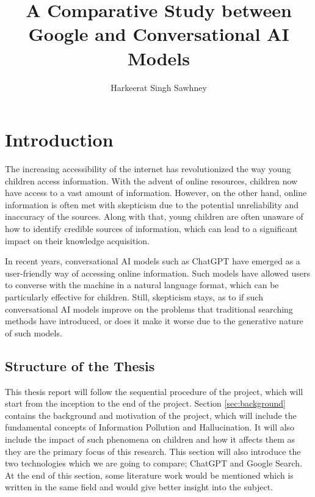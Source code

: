 \documentclass[50pt]{usiinfbachelorproject}
\author{Harkeerat Singh Sawhney}
\title{A Comparative Study between Google and Conversational AI Models}
\begin{document}
\maketitle
\tableofcontents

\newpage
\listoffigures
\listoftables

\newpage

\section{Introduction}
The increasing accessibility of the internet has revolutionized the way young children access information. With the advent of online resources, children now have access to a vast amount of information. However, on the other hand, online information \cite{slone2003internet} is often met with skepticism due to the potential unreliability and inaccuracy of the sources. Along with that, young children are often unaware of how to identify credible sources of information, which can lead to a significant impact on their knowledge acquisition.

In recent years, conversational AI models such as ChatGPT have emerged as a user-friendly way of accessing online information. Such models have allowed users to converse with the machine in a natural language format, which can be particularly effective for children. Still, skepticism stays, as to if such conversational AI models improve on the problems that traditional searching methods have introduced, or does it make it worse due to the generative nature of such models.

\subsection{Structure of the Thesis}
This thesis report will follow the sequential procedure of the project, which will start from the inception to the end of the project. Section \ref{sec:background} contains the background and motivation of the project, which will include the fundamental concepts of Information Pollution and Hallucination. It will also include the impact of such phenomena on children and how it affects them as they are the primary focus of this research. This section will also introduce the two technologies which we are going to compare; ChatGPT and Google Search. At the end of this section, some literature work would be mentioned which is written in the same field and would give better insight into the subject.
\end{document}
